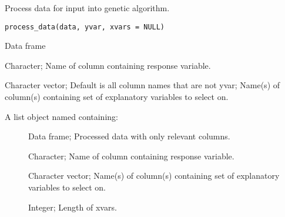 %
\begin{Description}\relax
Process data for input into genetic algorithm.
\end{Description}
%
\begin{Usage}
\begin{verbatim}
process_data(data, yvar, xvars = NULL)
\end{verbatim}
\end{Usage}
%
\begin{Arguments}
\begin{ldescription}
\item[\code{data}] Data frame

\item[\code{yvar}] Character; Name of column containing response variable.

\item[\code{xvars}] Character vector; Default is all column names that are not yvar;
Name(s) of column(s) containing set of explanatory variables to select on.
\end{ldescription}
\end{Arguments}
%
\begin{Value}
A list object named  containing:
\begin{description}

\item[] Data frame; Processed data with only relevant columns.
\item[] Character; Name of column containing response variable.
\item[] Character vector; Name(s) of column(s) containing
set of explanatory variables to select on.
\item[] Integer; Length of xvars.

\end{description}

\end{Value}
